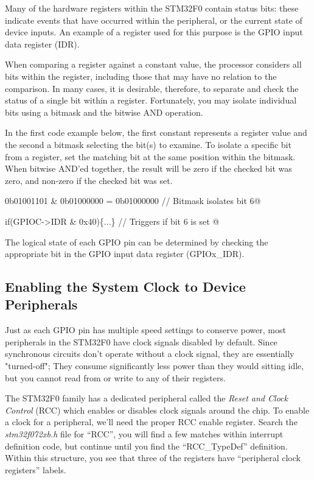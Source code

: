 \documentclass[11pt,fleqn]{book} %
\makeatletter
\newcommand{\ilcode}[1]{
    \begin{center} \parskip=-15pt \colorbox{gray!20!white}{
        \parbox{\columnwidth-2\fboxsep}{
            \lstinline@#1@
        }
    } \end{center}
}
\makeatother
\begin{document}
Many of the hardware registers within the STM32F0 contain status bits: these indicate events that have occurred within the peripheral, or the current state of device inputs. An example of a register used for this purpose is the GPIO input data register (IDR).

When comparing a register against a constant value, the processor considers all bits within the register, including those that may have no relation to the comparison. In many cases, it is desirable, therefore, to separate and check the status of a single bit within a register. Fortunately, you may isolate individual bits using a bitmask and the bitwise AND operation. 

\begin{example} 
In the first code example below, the first constant represents a register value and the second a bitmask selecting the bit(s) to examine. To isolate a specific bit from a register, set the matching bit at the same position within the bitmask. When bitwise AND'ed together, the result will be zero if the checked bit was zero, and non-zero if the checked bit was set. 

\ilcode{0b01001101 \& 0b01000000 = 0b01000000  // Bitmask isolates bit 6}

\ilcode{if(GPIOC->IDR \& 0x40)\{...\} // Triggers if bit 6 is set }
\smallskip
\end{example}

\begin{exercise}
    The logical state of each GPIO pin can be determined by checking the appropriate bit in the GPIO input data register (GPIOx\_IDR). 
    
\end{exercise}    
    
\subsection{Enabling the System Clock to Device Peripherals}

Just as each GPIO pin has multiple speed settings to conserve power, most peripherals in the STM32F0 have clock signals disabled by default. Since synchronous circuits don't operate without a clock signal, they are essentially "turned-off"; They consume significantly less power than they would sitting idle, but you cannot read from or write to any of their registers.

The STM32F0 family has a dedicated peripheral called the \textit{Reset and Clock Control} (RCC) which enables or disables clock signals around the chip. To enable a clock for a peripheral, we'll need the proper RCC enable register. Search the \textit{stm32f072xb.h} file for ``RCC'', you will find a few matches within interrupt definition code, but continue until you find the ``RCC\_TypeDef'' definition. Within this structure, you see that three of the registers have ``peripheral clock registers'' labels.
\end{document}
